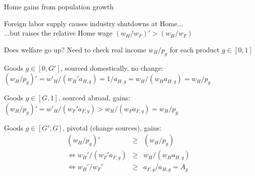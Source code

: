 \documentclass[notes,11pt, aspectratio=169, xcolor=table]{beamer}
\newenvironment{wideitemize}{\itemize\addtolength{\itemsep}{10pt}}{\enditemize}
\begin{document}
\begin{frame}{Home gains from population growth}
\begin{wideitemize}
    \item<1-> Foreign labor supply causes industry shutdowns at Home... \\
    \qquad ...but raises the relative Home wage $(w_H/w_F)'>(w_H/w_F)$

    \item<2-> Does welfare go up? Need to check real income $w_H / p_g$ for each product $g \in [0,1]$
    \begin{wideitemize}
        \item<3-> Goods $g \in [0,G']$, sourced domestically, no change: \\ $(w_H / p_g)'= w'_H / (w_H' a_{H,g}) = 1/a_{H,g} = w_H / (w_H a_{H,g}) = w_H / p_g$ 
        \item<4-> Goods $g \in [G,1]$, sourced abroad, gains: \\ $(w_H / p_g)'= w'_H / (w_F' a_{F,g}) > w_H / (w_F a_{F,g}) = w_H / p_g$
        \item<5-> Goods $g \in [G',G]$, pivotal (change sources), gains:
        \begin{eqnarray*}
            (w_H / p_g)' &\ge& (w_H / p_g) \\
            \iff w_H' / (w_F' a_{F,g}) &\ge& w_H / (w_H a_{H,g}) \\
            \iff w_H' / w_F'  &\ge& a_{F,g} / a_{H,g} = A_g
        \end{eqnarray*}
        \end{wideitemize}
    
    \end{wideitemize}
\end{frame}
\end{document}
